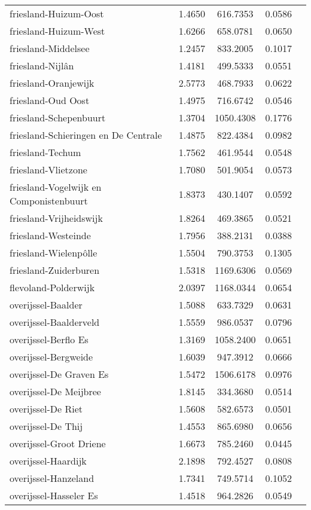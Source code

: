 \begin{longtable}{llccc}
friesland-Huizum-Oost & 1.4650 & 616.7353 & 0.0586 \\
friesland-Huizum-West & 1.6266 & 658.0781 & 0.0650 \\
friesland-Middelsee & 1.2457 & 833.2005 & 0.1017 \\
friesland-Nijlân & 1.4181 & 499.5333 & 0.0551 \\
friesland-Oranjewijk & 2.5773 & 468.7933 & 0.0622 \\
friesland-Oud Oost & 1.4975 & 716.6742 & 0.0546 \\
friesland-Schepenbuurt & 1.3704 & 1050.4308 & 0.1776 \\
friesland-Schieringen en De Centrale & 1.4875 & 822.4384 & 0.0982 \\
friesland-Techum & 1.7562 & 461.9544 & 0.0548 \\
friesland-Vlietzone & 1.7080 & 501.9054 & 0.0573 \\
friesland-Vogelwijk en Componistenbuurt & 1.8373 & 430.1407 & 0.0592 \\
friesland-Vrijheidswijk & 1.8264 & 469.3865 & 0.0521 \\
friesland-Westeinde & 1.7956 & 388.2131 & 0.0388 \\
friesland-Wielenpôlle & 1.5504 & 790.3753 & 0.1305 \\
friesland-Zuiderburen & 1.5318 & 1169.6306 & 0.0569 \\
flevoland-Polderwijk & 2.0397 & 1168.0344 & 0.0654 \\
overijssel-Baalder & 1.5088 & 633.7329 & 0.0631 \\
overijssel-Baalderveld & 1.5559 & 986.0537 & 0.0796 \\
overijssel-Berflo Es & 1.3169 & 1058.2400 & 0.0651 \\
overijssel-Bergweide & 1.6039 & 947.3912 & 0.0666 \\
overijssel-De Graven Es & 1.5472 & 1506.6178 & 0.0976 \\
overijssel-De Meijbree & 1.8145 & 334.3680 & 0.0514 \\
overijssel-De Riet & 1.5608 & 582.6573 & 0.0501 \\
overijssel-De Thij & 1.4553 & 865.6980 & 0.0656 \\
overijssel-Groot Driene & 1.6673 & 785.2460 & 0.0445 \\
overijssel-Haardijk & 2.1898 & 792.4527 & 0.0808 \\
overijssel-Hanzeland & 1.7341 & 749.5714 & 0.1052 \\
overijssel-Hasseler Es & 1.4518 & 964.2826 & 0.0549 \\

\end{longtable}
